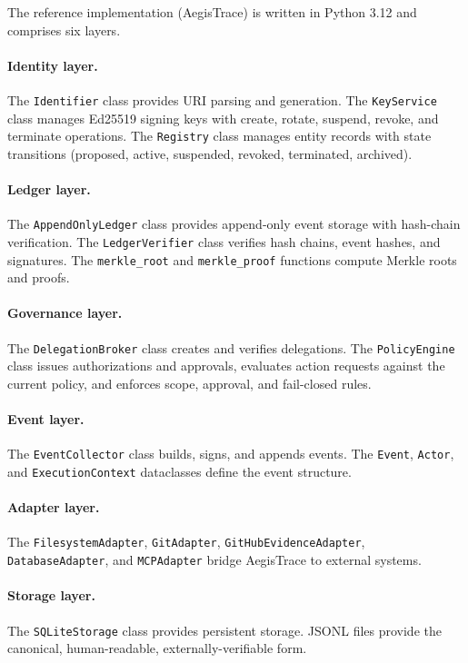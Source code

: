 \documentclass[11pt,a4paper]{article}
\begin{document}
The reference implementation (AegisTrace) is written in Python 3.12 and comprises six layers.

\paragraph{Identity layer.} The \texttt{Identifier} class provides URI parsing and generation. The \texttt{KeyService} class manages Ed25519 signing keys with create, rotate, suspend, revoke, and terminate operations. The \texttt{Registry} class manages entity records with state transitions (proposed, active, suspended, revoked, terminated, archived).

\paragraph{Ledger layer.} The \texttt{AppendOnlyLedger} class provides append-only event storage with hash-chain verification. The \texttt{LedgerVerifier} class verifies hash chains, event hashes, and signatures. The \texttt{merkle\_root} and \texttt{merkle\_proof} functions compute Merkle roots and proofs.

\paragraph{Governance layer.} The \texttt{DelegationBroker} class creates and verifies delegations. The \texttt{PolicyEngine} class issues authorizations and approvals, evaluates action requests against the current policy, and enforces scope, approval, and fail-closed rules.

\paragraph{Event layer.} The \texttt{EventCollector} class builds, signs, and appends events. The \texttt{Event}, \texttt{Actor}, and \texttt{ExecutionContext} dataclasses define the event structure.

\paragraph{Adapter layer.} The \texttt{FilesystemAdapter}, \texttt{GitAdapter}, \texttt{GitHubEvidenceAdapter}, \texttt{DatabaseAdapter}, and \texttt{MCPAdapter} bridge AegisTrace to external systems.

\paragraph{Storage layer.} The \texttt{SQLiteStorage} class provides persistent storage. JSONL files provide the canonical, human-readable, externally-verifiable form.
\end{document}
